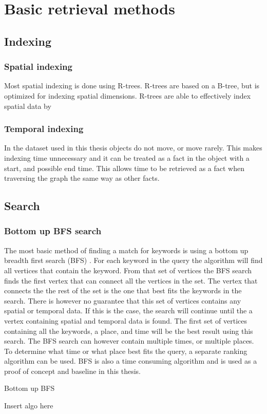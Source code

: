 
\chapter{Basic retrieval methods}

\section{Indexing}

\subsection{Spatial indexing}
Most spatial indexing is done using R-trees. R-trees are based on a B-tree, but is optimized for indexing spatial dimensions. R-trees are able to effectively index spatial data by 

\subsection{Temporal indexing}
In the dataset used in this thesis objects do not move, or move rarely. This makes indexing time unnecessary and it can be treated as a fact in the object with a start, and possible end time. This allows time to be retrieved as a fact when traversing the graph the same way as other facts.

\section{Search}
\subsection{Bottom up BFS search}
The most basic method of finding a match for keywords is using a bottom up breadth first search (BFS) \cite{He:2007:BRK:1247480.1247516}. For each keyword in the query the algorithm will find all vertices that contain the keyword. From that set of vertices the BFS search finds the first vertex that can connect all the vertices in the set. The vertex that connects the the rest of the set is the one that best fits the keywords in the search. There is however no guarantee that this set of vertices contains any spatial or temporal data. If this is the case, the search will continue until the a vertex containing spatial and temporal data is found. The first set of vertices containing all the keywords, a place, and time will be the best result using this search. The BFS search can however contain multiple times, or multiple places. To determine what time or what place best fits the query, a separate ranking algorithm can be used. BFS is also a time consuming algorithm and is used as a proof of concept and baseline in this thesis.

\begin{algorithm}
\caption{Bottom up BFS}
\begin{algorithmic}[1]
Insert algo here


\EndProcedure
\end{algorithmic}
\end{algorithm}

\cleardoublepage